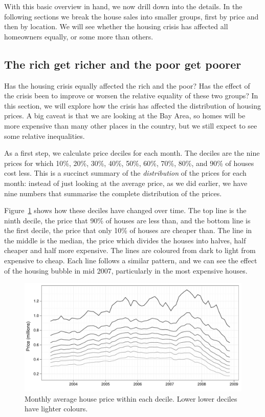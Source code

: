 \documentclass[oneside]{article}
\begin{document}
With this basic overview in hand, we now drill down into the details. In the following sections we break the house sales into smaller groups, first by price and then by location.  We will see whether the housing crisis has affected all homeowners equally, or some more than others.

\subsection{The rich get richer and the poor get poorer}

Has the housing crisis equally affected the rich and the poor?  Has the effect of the crisis been to improve or worsen the relative equality of these two groups?  In this section, we will explore how the crisis has affected the distribution of housing prices.  A big caveat is that we are looking at the Bay Area, so homes will be more expensive than many other places in the country, but we still expect to see some relative inequalities.

As a first step, we calculate price deciles for each month.  The deciles are the nine prices for which 10\%, 20\%, 30\%, 40\%, 50\%, 60\%, 70\%, 80\%, and 90\% of houses cost less.  This is a succinct summary of the {\it distribution} of the prices for each month: instead of just looking at the average price, as we did earlier, we have nine numbers that summarise the complete distribution of the prices. 

Figure~\ref{fig:decile-raw} shows how these deciles have changed over time.  The top line is the ninth decile, the price that 90\% of houses are less than, and the bottom line is the first decile, the price that only 10\% of houses are cheaper than.  The line in the middle is the median, the price which divides the houses into halves, half cheaper and half more expensive.  The lines are coloured from dark to light from expensive to cheap.  Each line follows a similar pattern, and we can see the effect of the housing bubble in mid 2007, particularly in the most expensive houses.  

\begin{figure}[htbp]
  \centering
  \includegraphics[width=0.75\linewidth]{decile-raw}
  \caption{Monthly average house price within each decile.  Lower lower deciles have lighter colours.} 
  \label{fig:decile-raw}
\end{figure}
\end{document}
